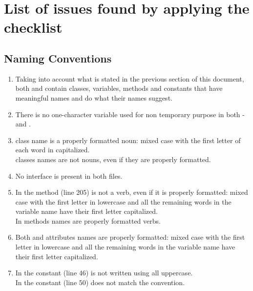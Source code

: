 \section{List of issues found by applying the checklist}

\subsection{Naming Conventions}
\begin{enumerate}[label={}\arabic*{},series=NUM]
    \item Taking into account what is stated in the previous section of this document, both  and  contain classes, variables, methods and constants that have meaningful names and do what their names suggest.
    
    \item There is no one-character variable used for non temporary purpose in both - and . %
    
    \item  {} class name is a properly formatted noun: mixed case with the first letter of each word in capitalized.\\
     classes names are not nouns, even if they are properly formatted.
    
    \item No interface is present in both files.
    
    \item In  the method  (line 205) is not a verb, even if it is properly formatted: mixed case with the first letter in lowercase and all the remaining words in the variable name have their first letter capitalized.\\
    In  methods names are properly formatted verbs.
    
    \item Both  and  attributes names are properly formatted: mixed case with the first letter in lowercase and all the remaining words in the variable name have their first letter capitalized.
    
    \item  In  the constant  (line 46) is not written using all uppercase.\\
    In  the constant  (line 50) does not match the convention.
\end{enumerate}

